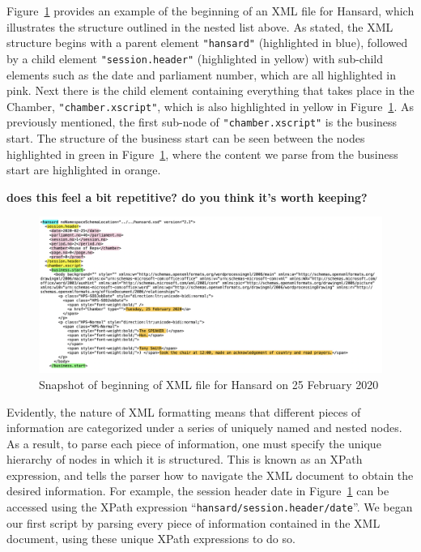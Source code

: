 \documentclass[
  letterpaper,
  DIV=11,
  numbers=noendperiod]{scrartcl}
\begin{document}
Figure~\ref{fig-xml1} provides an example of the beginning of an XML
file for Hansard, which illustrates the structure outlined in the nested
list above. As stated, the XML structure begins with a parent element
\texttt{"hansard"} (highlighted in blue), followed by a child element
\texttt{"session.header"} (highlighted in yellow) with sub-child
elements such as the date and parliament number, which are all
highlighted in pink. Next there is the child element containing
everything that takes place in the Chamber, \texttt{"chamber.xscript"},
which is also highlighted in yellow in Figure~\ref{fig-xml1}. As
previously mentioned, the first sub-node of \texttt{"chamber.xscript"}
is the business start. The structure of the business start can be seen
between the nodes highlighted in green in Figure~\ref{fig-xml1}, where
the content we parse from the business start are highlighted in orange.

\textbf{does this feel a bit repetitive? do you think it's worth
keeping?}

\begin{figure}

{\centering \includegraphics{images/xml1.png}

}

\caption{\label{fig-xml1}Snapshot of beginning of XML file for Hansard
on 25 February 2020}

\end{figure}

Evidently, the nature of XML formatting means that different pieces of
information are categorized under a series of uniquely named and nested
nodes. As a result, to parse each piece of information, one must specify
the unique hierarchy of nodes in which it is structured. This is known
as an XPath expression, and tells the parser how to navigate the XML
document to obtain the desired information. For example, the session
header date in Figure~\ref{fig-xml1} can be accessed using the XPath
expression ``\texttt{hansard/session.header/date}''. We began our first
script by parsing every piece of information contained in the XML
document, using these unique XPath expressions to do so.
\end{document}

